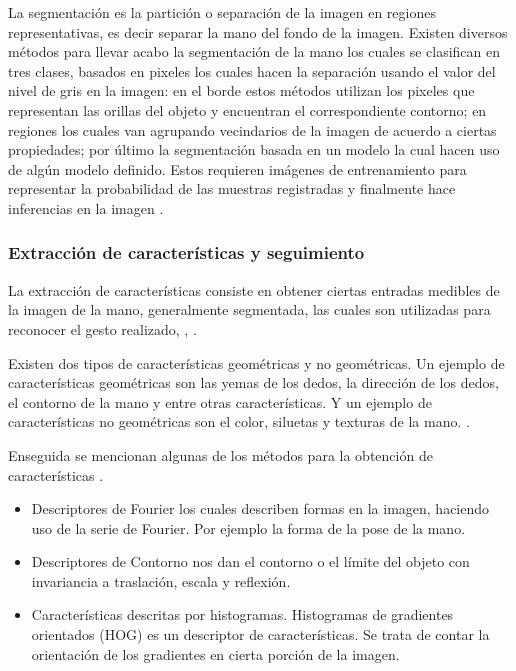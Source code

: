La segmentación es la partición o separación de la imagen en regiones representativas, es decir separar la mano del fondo de la imagen. Existen diversos métodos para llevar acabo la segmentación de la mano los cuales se clasifican en tres clases, basados en pixeles los cuales hacen la separación usando el valor del nivel de gris en la imagen: en el borde estos métodos utilizan los pixeles que representan las orillas del objeto y encuentran el correspondiente contorno; en regiones los cuales van agrupando vecindarios de la imagen de acuerdo a ciertas propiedades; por último la segmentación basada en un modelo la cual hacen uso de algún modelo definido. Estos requieren imágenes de entrenamiento para representar la probabilidad de las muestras registradas y finalmente hace inferencias en la imagen \citep{Ibraheem2013}.

\subsubsection{Extracción de características y seguimiento}\label{sssec:EtapaSeguimiento}  

La extracción de características consiste en obtener ciertas entradas medibles de la imagen de la mano, generalmente segmentada, las cuales son utilizadas para reconocer el gesto realizado, \citep{Premaratne2013}, \citep{Nayakwadi2014}.

Existen dos tipos de características geométricas y no geométricas. Un ejemplo de características geométricas son las yemas de los dedos, la dirección de los dedos, el contorno de la mano y entre otras características. Y un ejemplo de características no geométricas son el color, siluetas y texturas de la mano. \citep{Murthy2009}. 

Enseguida se mencionan algunas de los métodos para la obtención de características \citep{Premaratne2013}. 
\begin{itemize}
\item Descriptores de Fourier los cuales describen formas en la imagen, haciendo uso de la serie de Fourier. Por ejemplo la forma de la pose de la mano.
\item Descriptores de Contorno nos dan el contorno  o el límite del objeto con invariancia a traslación, escala  y reflexión.     
\item Características descritas por histogramas. Histogramas de gradientes orientados (HOG) es un descriptor de características. Se trata de contar la orientación de los gradientes en cierta porción de la imagen.  
\end{itemize}


